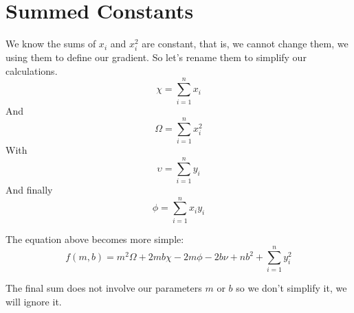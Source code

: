 \documentclass{article}
\begin{document}
\section{Summed Constants}

We know the sums of $x_i$ and $x_i^2$ are constant, that is, we cannot change them, we using them to define our gradient.
So let's rename them to simplify our calculations.
\begin{equation}
\chi = \sum_{i=1}^n x_i
\end{equation}
And
\begin{equation}
\Omega = \sum_{i=1}^n x_i^2
\end{equation}
With
\begin{equation}
\upsilon = \sum_{i=1}^n y_i
\end{equation}
And finally
\begin{equation}
\phi = \sum_{i=1}^n x_i y_i
\end{equation}

The equation above becomes more simple:
\begin{equation}
f(m, b) = m^2 \Omega + 2 m b \chi - 2 m \phi - 2 b \nu + n b^2 + \sum_{i=1}^n y_i^2 
\end{equation}

The final sum does not involve our parameters $m$ or $b$ so we don't simplify it, we will ignore it.
\end{document}

